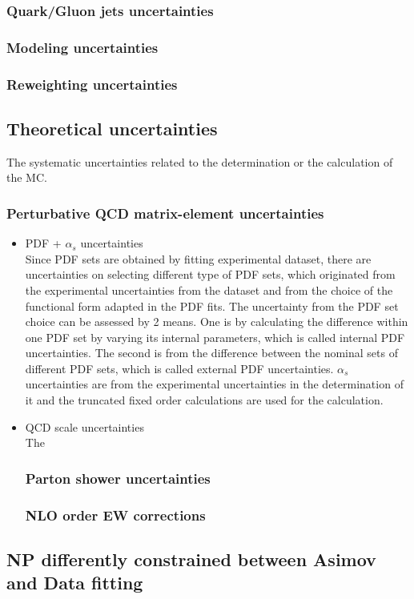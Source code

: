 \subsubsection{Quark/Gluon jets uncertainties}
\subsubsection{Modeling uncertainties}
\subsubsection{Reweighting uncertainties}
\subsection{Theoretical uncertainties}
The systematic uncertainties related to the determination or the calculation of the MC.
\subsubsection{Perturbative QCD matrix-element uncertainties}
\begin{itemize}
      \item PDF + $\alpha_s$ uncertainties\\
      Since PDF sets are obtained by fitting experimental dataset, there are uncertainties on selecting different type of PDF sets, which originated from the experimental uncertainties from the dataset and from the choice of the functional form adapted in the PDF fits.
      The uncertainty from the PDF set choice can be assessed by 2 means. One is by calculating the difference within one PDF set by varying its internal parameters, which is called internal PDF uncertainties. The second is from the difference between the nominal sets of different PDF sets, which is called external PDF uncertainties.
      $\alpha_s$ uncertainties are from the experimental uncertainties in the determination of it and the truncated fixed order calculations are used for the calculation.
      \item QCD scale uncertainties\\
      The 
\subsubsection{Parton shower uncertainties}
\subsubsection{NLO order EW corrections}
\end{itemize}

\subsection{NP differently constrained between Asimov and Data fitting}
